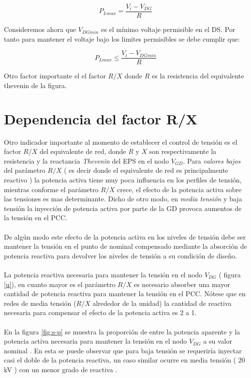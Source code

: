\documentclass[12pt, letterpaper]{report}
\begin{document}
\[P_{Lmax} = \dfrac{V_{i} - V_{DG }}{R}\]

Consideremos ahora que $V_{DGmin}$ es el mínimo voltaje permisible en el DS. Por tanto para mantener el voltaje bajo los limites permisibles  se debe cumplir que:

\[P_{Lmax} \leq \dfrac{V_{i} - V_{DGmin}}{R}\]

Otro factor importante   el el factor $ R/X $ donde $ R $ es la resistencia  del equivalente thevenin de la figura.
\section{Dependencia del factor R/X}
Otro indicador importante al momento de establecer el control de tensión es el factor $ R/X$ del equivalente de red, donde $R$  y $X$ son respectivamente la resistencia y la reactancia  \textit{Thevenin} del EPS en el nodo $V_{GD}$.    Para \textit{valores bajos} del parámetro $R/X$ ( es decir donde el equivalente de red es principalmente reactivo ) la potencia activa tiene muy poca  influencia en los perfiles de tensión, mientras conforme el parámetro $R/X$ crece, el efecto de la potencia activa sobre las tensiones es mas determinante. Dicho de otro modo, en \textit{media tensión } y baja tensión la inyección de potencia activa por parte de la GD provoca aumentos de la tensión en el PCC.\\\\
De algún modo este efecto de la potencia activa en los niveles de tensión debe ser mantener la tensión en el punto de nominal compensado mediante la absorción de potencia reactiva para devolver los niveles de tensión a su condición de diseño.\\\\
La potencia reactiva necesaria para mantener la tensión en el nodo $ V_{DG}$ ( figura \ref{u}), en cuanto mayor es el parámetro $R/X$ es necesario absorber una mayor cantidad de potencia reactiva  para mantener la tensión en el PCC. Nótese que en redes de media tensión ($R/X$ alrededor de la unidad) la cantidad de  reactiva necesaria para compensar el efecto de la potencia activa es 2 a 1.\\\\
En la figura \ref{fig:s-p} se muestra  la proporción de entre la potencia aparente  y la potencia activa necesaria para mantener la tensión  en el nodo $V_{DG}$ a su valor nominal . En esta se puede observar que para baja tensión se requeriría inyectar  casi el doble de la potencia reactiva, un caso similar ocurre en media tensión     ( 20 kV ) con un menor grado de reactiva \cite{trebolle2012control}.
\end{document}
